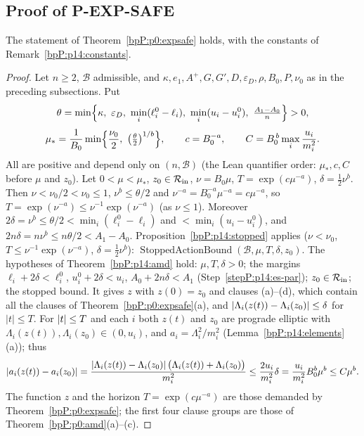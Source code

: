 \subsection{Proof of P-EXP-SAFE}\label{bpP:p14:sec-expsafe}

\begin{theorem}\label{bpP:p14:expsafe}
The statement of Theorem~\ref{bpP:p0:expsafe} holds, with the constants of Remark~\ref{bpP:p14:constants}.
\end{theorem}
\begin{proof}
\label{stepP:p14:es-const} Let $n\ge2$, $\mathcal B$ admissible, and $\kappa,e_1,A^+,G,G',D,\varepsilon_D,\rho,B_0,P,\nu_0$ as in the preceding subsections. Put
\[\theta=\min\Bigl\{\kappa,\ \varepsilon_D,\ \min_i(\ell^0_i-\ell_i),\ \min_i(u_i-u_i^0),\ \tfrac{A_1-A_0}n\Bigr\}>0,\]
\[\mu_*=\frac1{B_0}\min\Bigl\{\frac{\nu_0}2,\ \bigl(\tfrac\theta2\bigr)^{1/b}\Bigr\},\qquad c=B_0^{-a},\qquad C=B_0^{\,b}\max_i\frac{u_i}{m_i^2}.\]
All are positive and depend only on $(n,\mathcal B)$ (the Lean quantifier order: $\mu_*,c,C$ before $\mu$ and $z_0$).
\label{stepP:p14:es-par} Let $0<\mu<\mu_*$, $z_0\in\mathcal R_{\rm in}$, $\nu=B_0\mu$, $T=\exp(c\mu^{-a})$, $\delta=\frac12\nu^b$. Then $\nu<\nu_0/2<\nu_0\le1$, $\nu^b\le\theta/2$ and $\nu^{-a}=B_0^{-a}\mu^{-a}=c\mu^{-a}$, so $T=\exp(\nu^{-a})\le\nu^{-1}\exp(\nu^{-a})$ (as $\nu\le1$). Moreover $2\delta=\nu^b\le\theta/2<\min_i(\ell_i^0-\ell_i)$ and $<\min_i(u_i-u_i^0)$, and $2n\delta=n\nu^b\le n\theta/2<A_1-A_0$.
\label{stepP:p14:es-stop} Proposition~\ref{bpP:p14:stopped} applies ($\nu<\nu_0$, $T\le\nu^{-1}\exp(\nu^{-a})$, $\delta=\frac12\nu^b$): $\operatorname{StoppedActionBound}(\mathcal B,\mu,T,\delta,z_0)$.
\label{stepP:p14:es-amd} The hypotheses of Theorem~\ref{bpP:p14:amd} hold: $\mu,T,\delta>0$; the margins $\ell_i+2\delta<\ell_i^0$, $u_i^0+2\delta<u_i$, $A_0+2n\delta<A_1$ (Step~\ref{stepP:p14:es-par}); $z_0\in\mathcal R_{\rm in}$; the stopped bound. It gives $z$ with $z(0)=z_0$ and clauses (a)--(d), which contain all the clauses of Theorem~\ref{bpP:p0:expsafe}(a), and $\lvert \Lambda_i(z(t))-\Lambda_i(z_0)\rvert\le\delta$ for $|t|\le T$.
\label{stepP:p14:es-axis} For $\lvert t\rvert\le T$ and each $i$ both $z(t)$ and $z_0$ are prograde elliptic with $\Lambda_i(z(t)),\Lambda_i(z_0)\in(0,u_i)$, and $a_i=\Lambda_i^2/m_i^2$ (Lemma~\ref{bpP:p14:elements}(a)); thus
\[\lvert a_i(z(t))-a_i(z_0)\rvert=\frac{\lvert \Lambda_i(z(t))-\Lambda_i(z_0)\rvert\,\bigl(\Lambda_i(z(t))+\Lambda_i(z_0)\bigr)}{m_i^2}\le\frac{2u_i}{m_i^2}\delta=\frac{u_i}{m_i^2}B_0^b\mu^b\le C\mu^b.\]
\label{stepP:p14:es-assemble} The function $z$ and the horizon $T=\exp(c\mu^{-a})$ are those demanded by Theorem~\ref{bpP:p0:expsafe}; the first four clause groups are those of Theorem~\ref{bpP:p0:amd}(a)--(c).
\end{proof}

